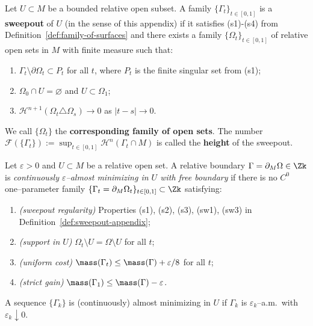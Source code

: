 \begin{definition}\label{def:sweepout-appendix}
Let $U \subset M$ be a bounded relative open subset. A family $\{\Gamma_t\}_{t \in [0, 1]}$ is a \textbf{sweepout} of $U$ (in the sense of this appendix) if it satisfies (s1)-(s4) from Definition~\ref{def:family-of-surfaces} and there exists a family $\{\Omega_t\}_{t \in [0, 1]}$ of relative open sets in $M$ with finite measure such that:
\begin{enumerate}
    \item[(sw1)] $\Gamma_t \setminus \partial \Omega_t \subset P_t$ for all $t$, where $P_t$ is the finite singular set from (s1);

    \item[(sw2)] $\Omega_0 \cap U = \varnothing$ and $U \subset \Omega_1$;

    \item[(sw3)] $\mathcal{H}^{n + 1}(\Omega_t \triangle \Omega_s) \to 0$ as $|t - s| \to 0$.
\end{enumerate}
We call $\{\Omega_t\}$ the \textbf{corresponding family of open sets}.
The number $\mathcal{F}(\{\Gamma_t\}):=\sup_{t\in[0,1]}\mathcal{H}^n(\Gamma_t\cap M)$ is called the \textbf{height} of the sweepout.
\end{definition}

\begin{definition}\label{def:cts-am-rel}\label{def:AM-rel}
Let $\varepsilon>0$ and $U\subset M$ be a relative open set. A relative boundary
$\Gamma=\partial_M\Omega\in\Zk$ is \emph{continuously $\varepsilon$–almost minimizing in $U$ with free boundary}
if there is no $C^0$ one–parameter family $\{\Gamma_t=\partial_M\Omega_t\}_{t\in[0,1]}\subset\Zk$
satisfying:
\begin{enumerate}[label=(\alph*)]
\item \emph{(sweepout regularity)} Properties \textup{(s1), (s2), (s3), (sw1), (sw3)} in Definition~\ref{def:sweepout-appendix};
\item \emph{(support in $U$)} $\Omega_t\setminus U=\Omega\setminus U$ for all $t$;
\item \emph{(uniform cost)} $\mass(\Gamma_t)\le \mass(\Gamma)+\varepsilon/8$ for all $t$;
\item \emph{(strict gain)} $\mass(\Gamma_1)\le \mass(\Gamma)-\varepsilon$.
\end{enumerate}
A sequence $\{\Gamma_k\}$ is (continuously) almost minimizing in $U$ if $\Gamma_k$ is
$\varepsilon_k$–a.m.\ with $\varepsilon_k\downarrow 0$.
\end{definition}

